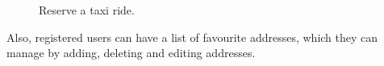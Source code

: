 \begin{figure}%
	\hfill%
	\hfill%
	\caption{Reserve a taxi ride.}\label{fig:reservation}
\end{figure}

\clearpage

Also, registered users can have a list of favourite addresses, which they can manage by adding, deleting and editing addresses.

